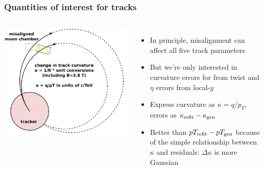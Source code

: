 \documentclass[compress]{beamer}
\newcommand{\s}[1]{{\mbox{\scriptsize #1}}}
\begin{document}
\begin{frame}
\frametitle{Quantities of interest for tracks}
\begin{columns}
\includegraphics[width=\linewidth]{units.png}
\begin{itemize}
\item In principle, misalignment can affect all five track parameters
\item But we're only interested in curvature errors for
from twist and $\eta$ errors from local-$y$
\item Express curvature as $\kappa = q/p_T$, errors as
$\kappa_\s{refit} - \kappa_\s{gen}$
\item Better than $pT_\s{refit} - pT_\s{gen}$ because of the simple
relationship between $\kappa$ and residuals: $\Delta \kappa$ is more Gaussian
\end{itemize}
\end{columns}
\end{frame}
\end{document}
